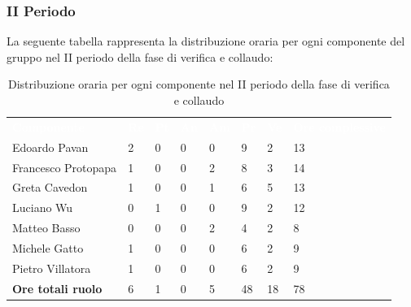 \subsubsection{II Periodo}
La seguente tabella rappresenta la distribuzione oraria per ogni componente del gruppo nel II periodo della fase di verifica e collaudo:
\begin{table}[!htbp]
\begin{center}
\renewcommand{\arraystretch}{1.25}
\begin{tabular}{ m{}<{\centering}  m{}<{\centering} m{}<{\centering} m{}<{\centering}  m{}<{\centering}  m{}<{\centering}  m{}<{\centering}  m{}<{\centering}   }
	\rowcolor{darkblue}
	\textcolor{white}{\textbf{Componente}} &\textcolor{white}{\textbf{Re}}&\textcolor{white}{\textbf{Pt}}&\textcolor{white}{\textbf{An}}&\textcolor{white}{\textbf{Am}}&\textcolor{white}{\textbf{Pr}}&\textcolor{white}{\textbf{Ve}}&\textcolor{white}{\textbf{Ore complessive}}\\ 
	Edoardo Pavan & 2 & 0 & 0 & 0 & 9 & 2 & 13 \\	
	
	Francesco Protopapa & 1 & 0 & 0 & 2 & 8 & 3 & 14 \\

	Greta Cavedon & 1 & 0 & 0 & 1 & 6 & 5 & 13 \\
	
	Luciano Wu & 0 & 1 & 0 & 0 & 9 & 2 & 12 \\
	
	Matteo Basso & 0 & 0 & 0 & 2 & 4 & 2 & 8 \\
	
	Michele Gatto & 1 & 0 & 0 & 0 & 6 & 2 & 9 \\
	
	Pietro Villatora & 1 & 0 & 0 & 0 & 6 & 2 & 9 \\
	
	\textbf{Ore totali ruolo} & 6 & 1 & 0 & 5 & 48 & 18 & 78 \\

\end{tabular}
\caption{Distribuzione oraria per ogni componente nel II periodo della fase di verifica e collaudo}
\end{center}
\end{table}

